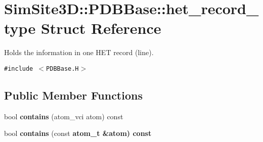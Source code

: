 \section{SimSite3D::PDBBase::het\_\-record\_\-type Struct Reference}
\label{structSimSite3D_1_1PDBBase_1_1het__record__type}
Holds the information in one HET record (line).  


{\tt \#include $<$PDBBase.H$>$}

\subsection*{Public Member Functions}
\begin{CompactItemize}
\item 
bool \textbf{contains} (atom\_\-vci atom) const \label{structSimSite3D_1_1PDBBase_1_1het__record__type_bc330509162725271ba3ea107759b095}

\item 
bool \textbf{contains} (const \bf{atom\_\-t} \&atom) const \label{structSimSite3D_1_1PDBBase_1_1het__record__type_0b9716fa4db07e2c1f2fb6de9824462b}

\end{CompactItemize}
